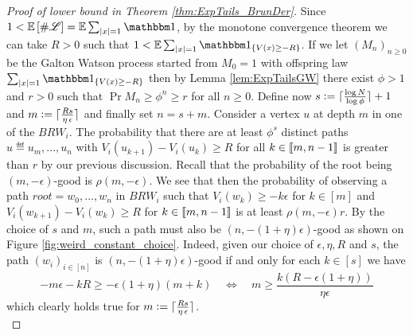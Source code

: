 \begin{proof}[Proof of lower bound in Theorem \ref{thm:ExpTails_BrunDer}]
Since $1 < \Ex{\#\scr{L}} = \E\sum_{|x|=1} \Ind$, by the monotone convergence theorem we can take $R > 0$ such that $1 < \E\sum_{|x|=1} \Ind_{\{ V(x) \geq -R\}}$. If we let $(M_n)_{n \geq 0}$ be the Galton Watson process started from $M_0 = 1$ with offspring law $\sum_{|x|=1} \Ind_{\{ V(x) \geq -R\}}$ then by Lemma \ref{lem:ExpTailsGW} there exist $\phi > 1$ and $r > 0$ such that $\Pr{M_n \geq \phi^n} \geq r$ for all $n \geq 0$. Define now $s \vcentcolon= \lceil\frac{\log N}{\log \phi}\rceil + 1$ and $m \vcentcolon= \lceil\frac{Rs}{\eta\, \epsilon}\rceil$ and finally set $n = s + m$. Consider a vertex $u$ at depth $m$ in one of the $BRW_i$. The probability that there are at least $\phi^s$ distinct paths $u \eqdef u_m, ..., u_n$ with $V_i(u_{k+1}) - V_i(u_k) \geq R$ for all $k \in \llbracket m, n - 1\rrbracket$ is greater than $r$ by our previous discussion. Recall that the probability of the root being $(m, - \epsilon)$-good is $\rho(m, - \epsilon)$. We see that then the probability of observing a path $root = w_0, ..., w_n$ in $BRW_i$ such that $V_i(w_k) \geq - k \epsilon$ for $k \in [m]$ and $V_i(w_{k+1}) - V_i(w_k) \geq R$ for $k \in \llbracket m, n-1\rrbracket$ is at least $\rho(m, - \epsilon) r$. By the choice of $s$ and $m$, such a path must also be $(n,  - (1+\eta)\epsilon)$-good as shown on Figure \ref{fig:weird_constant_choice}. Indeed, given our choice of $\epsilon, \eta, R$ and $s$, the path $(w_i)_{i \in [n]}$ is $(n, -(1+\eta)\epsilon)$-good if and only for each $k \in [s]$ we have
\begin{equation}
-m\epsilon - kR \geq -\epsilon(1 + \eta)(m + k) \quad\iff\quad m \geq \frac{k(R - \epsilon(1 + \eta))}{\eta \epsilon}
\end{equation}
which clearly holds true for $m \vcentcolon= \lceil\frac{Rs}{\eta\, \epsilon}\rceil$. \\


\end{proof}
